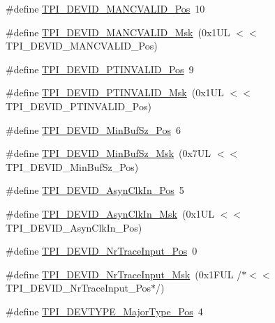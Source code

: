 \begin{DoxyCompactItemize}
\item 
\#define \hyperlink{group___c_m_s_i_s___t_p_i_ga675534579d9e25477bb38970e3ef973c}{T\+P\+I\+\_\+\+D\+E\+V\+I\+D\+\_\+\+M\+A\+N\+C\+V\+A\+L\+I\+D\+\_\+\+Pos}~10
\item 
\#define \hyperlink{group___c_m_s_i_s___t_p_i_ga4c3ee4b1a34ad1960a6b2d6e7e0ff942}{T\+P\+I\+\_\+\+D\+E\+V\+I\+D\+\_\+\+M\+A\+N\+C\+V\+A\+L\+I\+D\+\_\+\+Msk}~(0x1\+U\+L $<$$<$ T\+P\+I\+\_\+\+D\+E\+V\+I\+D\+\_\+\+M\+A\+N\+C\+V\+A\+L\+I\+D\+\_\+\+Pos)
\item 
\#define \hyperlink{group___c_m_s_i_s___t_p_i_ga974cccf4c958b4a45cb71c7b5de39b7b}{T\+P\+I\+\_\+\+D\+E\+V\+I\+D\+\_\+\+P\+T\+I\+N\+V\+A\+L\+I\+D\+\_\+\+Pos}~9
\item 
\#define \hyperlink{group___c_m_s_i_s___t_p_i_ga1ca84d62243e475836bba02516ba6b97}{T\+P\+I\+\_\+\+D\+E\+V\+I\+D\+\_\+\+P\+T\+I\+N\+V\+A\+L\+I\+D\+\_\+\+Msk}~(0x1\+U\+L $<$$<$ T\+P\+I\+\_\+\+D\+E\+V\+I\+D\+\_\+\+P\+T\+I\+N\+V\+A\+L\+I\+D\+\_\+\+Pos)
\item 
\#define \hyperlink{group___c_m_s_i_s___t_p_i_ga3f7da5de2a34be41a092e5eddd22ac4d}{T\+P\+I\+\_\+\+D\+E\+V\+I\+D\+\_\+\+Min\+Buf\+Sz\+\_\+\+Pos}~6
\item 
\#define \hyperlink{group___c_m_s_i_s___t_p_i_ga939e068ff3f1a65b35187ab34a342cd8}{T\+P\+I\+\_\+\+D\+E\+V\+I\+D\+\_\+\+Min\+Buf\+Sz\+\_\+\+Msk}~(0x7\+U\+L $<$$<$ T\+P\+I\+\_\+\+D\+E\+V\+I\+D\+\_\+\+Min\+Buf\+Sz\+\_\+\+Pos)
\item 
\#define \hyperlink{group___c_m_s_i_s___t_p_i_gab382b1296b5efd057be606eb8f768df8}{T\+P\+I\+\_\+\+D\+E\+V\+I\+D\+\_\+\+Asyn\+Clk\+In\+\_\+\+Pos}~5
\item 
\#define \hyperlink{group___c_m_s_i_s___t_p_i_gab67830557d2d10be882284275025a2d3}{T\+P\+I\+\_\+\+D\+E\+V\+I\+D\+\_\+\+Asyn\+Clk\+In\+\_\+\+Msk}~(0x1\+U\+L $<$$<$ T\+P\+I\+\_\+\+D\+E\+V\+I\+D\+\_\+\+Asyn\+Clk\+In\+\_\+\+Pos)
\item 
\#define \hyperlink{group___c_m_s_i_s___t_p_i_ga80ecae7fec479e80e583f545996868ed}{T\+P\+I\+\_\+\+D\+E\+V\+I\+D\+\_\+\+Nr\+Trace\+Input\+\_\+\+Pos}~0
\item 
\#define \hyperlink{group___c_m_s_i_s___t_p_i_gabed454418d2140043cd65ec899abd97f}{T\+P\+I\+\_\+\+D\+E\+V\+I\+D\+\_\+\+Nr\+Trace\+Input\+\_\+\+Msk}~(0x1\+F\+U\+L /$\ast$$<$$<$ T\+P\+I\+\_\+\+D\+E\+V\+I\+D\+\_\+\+Nr\+Trace\+Input\+\_\+\+Pos$\ast$/)
\item 
\#define \hyperlink{group___c_m_s_i_s___t_p_i_ga69c4892d332755a9f64c1680497cebdd}{T\+P\+I\+\_\+\+D\+E\+V\+T\+Y\+P\+E\+\_\+\+Major\+Type\+\_\+\+Pos}~4

\end{DoxyCompactItemize}
